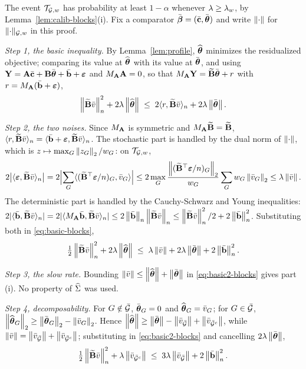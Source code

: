 The event $\Tw$ has probability at least $1-\alpha$ whenever
$\pen \ge \pen_{w}$, by Lemma~\ref{lem:calib-blocks}(i). Fix a comparator
$\bar\bbeta = (\bar\bc,\thbar)$ and write $\norm{\cdot}$ for $\nGw{\cdot}$ in
this proof.

\emph{Step 1, the basic inequality.} By Lemma~\ref{lem:profile}, $\thetahat$
minimizes the residualized objective; comparing its value at $\thetahat$ with
its value at $\thbar$, and using $\bY = \Amat\bar\bc + \Bmat\thbar + \bbar +
\bveps$ and $\MA\Amat = 0$, so that $\MA\bY = \Btil\thbar + r$ with
$r = \MA(\bbar + \bveps)$,
\begin{equation}
  \label{eq:basic-blocks}
  \normn{\Btil\vbar}^{2} + 2\pen\norm{\thetahat}
  \;\le\; 2\inner{r}{\Btil\vbar}_{n} + 2\pen\norm{\thbar} .
\end{equation}

\emph{Step 2, the two noises.} Since $\MA$ is symmetric and $\MA\Btil = \Btil$,
$\inner{r}{\Btil\vbar}_{n} = \inner{\bbar+\bveps}{\Btil\vbar}_{n}$. The
stochastic part is handled by the dual norm of $\norm{\cdot}$, which is
$z \mapsto \max_{G}\norm{z_{G}}_{2}/w_{G}$: on $\Tw$,
\[
  2\bigl|\inner{\bveps}{\Btil\vbar}_{n}\bigr|
  = 2\Bigl|\sum_{G}\inner{(\Btil\T\bveps/n)_{G}}{\vbar_{G}}\Bigr|
  \le 2\max_{G}\frac{\norm{(\Btil\T\bveps/n)_{G}}_{2}}{w_{G}}
  \sum_{G}w_{G}\norm{\vbar_{G}}_{2}
  \le \pen\norm{\vbar} .
\]
The deterministic part is handled by the Cauchy-Schwarz and Young
inequalities: $2|\inner{\bbar}{\Btil\vbar}_{n}| =
2|\inner{\MA\bbar}{\Btil\vbar}_{n}| \le 2\normn{\bbar}\normn{\Btil\vbar} \le
\normn{\Btil\vbar}^{2}/2 + 2\normn{\bbar}^{2}$. Substituting both in
\eqref{eq:basic-blocks},
\begin{equation}
  \label{eq:basic2-blocks}
  \tfrac12\normn{\Btil\vbar}^{2} + 2\pen\norm{\thetahat}
  \;\le\; \pen\norm{\vbar} + 2\pen\norm{\thbar} + 2\normn{\bbar}^{2} .
\end{equation}

\emph{Step 3, the slow rate.} Bounding $\norm{\vbar} \le \norm{\thetahat} +
\norm{\thbar}$ in \eqref{eq:basic2-blocks} gives part (i). No property of
$\Gramhat$ was used.

\emph{Step 4, decomposability.} For $G \notin \Gbar$, $\thbar_{G} = 0$ and
$\thetahat_{G} = \vbar_{G}$; for $G \in \Gbar$,
$\norm{\thetahat_{G}}_{2} \ge \norm{\thbar_{G}}_{2} - \norm{\vbar_{G}}_{2}$.
Hence $\norm{\thetahat} \ge \norm{\thbar} - \norm{\vbar_{\Gbar}} +
\norm{\vbar_{\Gbar^{c}}}$, while $\norm{\vbar} = \norm{\vbar_{\Gbar}} +
\norm{\vbar_{\Gbar^{c}}}$; substituting in \eqref{eq:basic2-blocks} and
cancelling $2\pen\norm{\thbar}$,
\begin{equation}
  \label{eq:cone-blocks}
  \tfrac12\normn{\Btil\vbar}^{2} + \pen\norm{\vbar_{\Gbar^{c}}}
  \;\le\; 3\pen\norm{\vbar_{\Gbar}} + 2\normn{\bbar}^{2} .
\end{equation}

